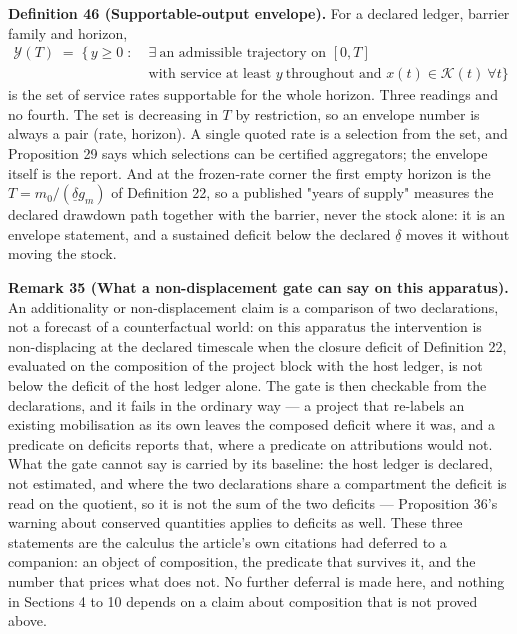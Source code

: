 \documentclass[11pt]{article}
\begin{document}
\textbf{Definition 46 (Supportable-output envelope).} For a declared ledger, barrier family and horizon,
\[ \begin{aligned} \mathcal Y(T) \;=\; \bigl\{\, y \ge 0 \;:\;& \exists\ \text{an admissible trajectory on } [0,T] \ \\
  & \text{with service at least } y \ \text{throughout and } x(t) \in \mathcal K(t) \ \forall t \bigr\} \end{aligned} \]
is the set of service rates supportable for the whole horizon. Three readings and no fourth. The set is
decreasing in \(T\) by restriction, so an envelope number is always a pair (rate, horizon). A single quoted
rate is a selection from the set, and Proposition 29 says which selections can be certified aggregators;
the envelope itself is the report. And at the frozen-rate corner the first empty horizon is the
\(T = m_0/(\underline\delta g_m)\) of Definition 22, so a published "years of supply" measures the declared
drawdown path together with the barrier, never the stock alone: it is an envelope statement, and a
sustained deficit below the declared \(\underline\delta\) moves it without moving the stock.

\textbf{Remark 35 (What a non-displacement gate can say on this apparatus).} An additionality or
non-displacement claim is a comparison of two declarations, not a forecast of a counterfactual world: on this
apparatus the intervention is non-displacing at the declared timescale when the closure deficit of
Definition 22, evaluated on the composition of the project block with the host ledger, is not below the
deficit of the host ledger alone. The gate is then checkable from the declarations, and it fails in the
ordinary way --- a project that re-labels an existing mobilisation as its own leaves the composed deficit
where it was, and a predicate on deficits reports that, where a predicate on attributions would not. What
the gate cannot say is carried by its baseline: the host ledger is declared, not estimated, and where the
two declarations share a compartment the deficit is read on the quotient, so it is not the sum of the two
deficits --- Proposition 36's warning about conserved quantities applies to deficits as well.
These three statements are the calculus the article's own citations had deferred to a companion: an
object of composition, the predicate that survives it, and the number that prices what does not. No
further deferral is made here, and nothing in Sections 4 to 10 depends on a claim about composition
that is not proved above.
\end{document}
